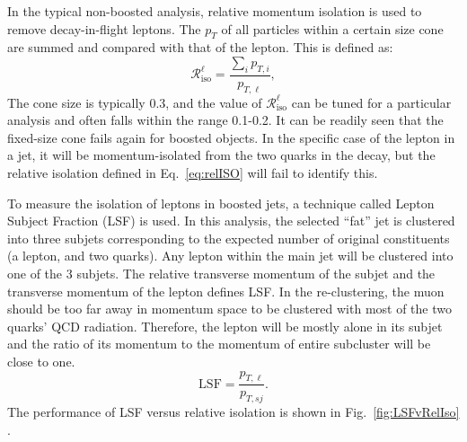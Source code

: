 In the typical non-boosted analysis, relative momentum isolation is used to remove decay-in-flight leptons. The \ensuremath{p_T} of all particles within a certain size cone are summed and compared with that of the lepton. This is defined as:
\begin{equation}
    \label{eq:relISO}
    \mathcal{R}_{\text{iso}}^{\ell}
    =
    \frac{\sum_{i}p_{T,i}}{p_{T,\ell}},
\end{equation}
The cone size is typically 0.3, and the value of \ensuremath{\mathcal{R}_{\text{iso}}^{\ell}} can be tuned for a particular analysis and often falls within the range 0.1-0.2.
It can be readily seen that the fixed-size cone fails again for boosted objects. In the specific case of the lepton in a \NR jet, it will be momentum-isolated from the two quarks in the \NR decay, but the relative isolation defined in Eq.~\ref{eq:relISO} will fail to identify this. 

To measure the isolation of leptons in boosted jets, a technique called Lepton Subject Fraction (LSF) is used. In this analysis, the selected ``fat'' jet is clustered into three subjets corresponding to the expected number of original constituents (a lepton, and two quarks). Any lepton within the main jet will be clustered into one of the 3 subjets. The relative transverse momentum of the subjet and the transverse momentum of the lepton defines LSF. In the re-clustering, the muon should be too far away in momentum space to be clustered with most of the two quarks' QCD radiation. Therefore, the lepton will be mostly alone in its subjet and the ratio of its momentum to the momentum of entire subcluster will be close to one.
\begin{equation}
    \label{eq:LSF}
    \mathrm{LSF}
    =
    \frac{p_{T,\ell}}{p_{T,sj}}.
\end{equation}
The performance of LSF versus relative isolation is shown in Fig.~\ref{fig:LSFvRelIso} \cite{PHPaperLSF}.

